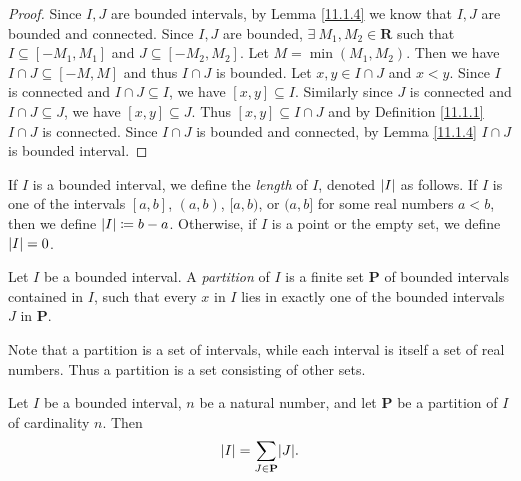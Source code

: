 \begin{proof}
    Since \(I, J\) are bounded intervals, by Lemma \ref{11.1.4} we know that \(I, J\) are bounded and connected.
    Since \(I, J\) are bounded, \(\exists\ M_1, M_2 \in \mathbf{R}\) such that \(I \subseteq [-M_1, M_1]\) and \(J \subseteq [-M_2, M_2]\).
    Let \(M = \min(M_1, M_2)\).
    Then we have \(I \cap J \subseteq [-M, M]\) and thus \(I \cap J\) is bounded.
    Let \(x, y \in I \cap J\) and \(x < y\).
    Since \(I\) is connected and \(I \cap J \subseteq I\), we have \([x, y] \subseteq I\).
    Similarly since \(J\) is connected and \(I \cap J \subseteq J\), we have \([x, y] \subseteq J\).
    Thus \([x, y] \subseteq I \cap J\) and by Definition \ref{11.1.1} \(I \cap J\) is connected.
    Since \(I \cap J\) is bounded and connected, by Lemma \ref{11.1.4} \(I \cap J\) is bounded interval.
\end{proof}

\setcounter{theorem}{7}
\begin{definition}\label{11.1.8}
    If \(I\) is a bounded interval, we define the \emph{length} of \(I\), denoted \(\abs*{I}\) as follows.
    If \(I\) is one of the intervals \([a, b]\), \((a, b)\), \([a, b)\), or \((a, b]\) for some real numbers \(a < b\), then we define \(\abs*{I} \coloneqq b - a\).
    Otherwise, if \(I\) is a point or the empty set, we define \(\abs*{I} = 0\).
\end{definition}

\setcounter{theorem}{9}
\begin{definition}[Partitions]\label{11.1.10}
    Let \(I\) be a bounded interval.
    A \emph{partition} of \(I\) is a finite set \(\mathbf{P}\) of bounded intervals contained in \(I\), such that every \(x\) in \(I\) lies in exactly one of the bounded intervals \(J\) in \(\mathbf{P}\).
\end{definition}

\begin{remark}\label{11.1.11}
    Note that a partition is a set of intervals, while each interval is itself a set of real numbers.
    Thus a partition is a set consisting of other sets.
\end{remark}

\setcounter{theorem}{12}
\begin{theorem}\label{11.1.13}
    Let \(I\) be a bounded interval, \(n\) be a natural number, and let \(\mathbf{P}\) be a partition of \(I\) of cardinality \(n\).
    Then
    \[
        \abs*{I} = \sum_{J \in \mathbf{P}} \abs*{J}.
    \]
\end{theorem}

